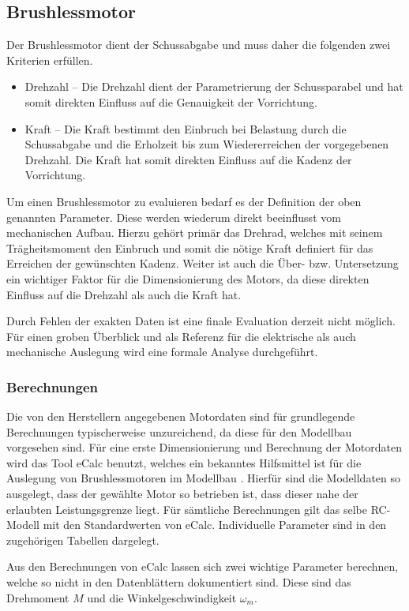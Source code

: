\subsection{Brushlessmotor}
Der Brushlessmotor dient der Schussabgabe und muss daher die folgenden
zwei Kriterien erfüllen.

\begin{itemize}
	\item Drehzahl -- Die Drehzahl dient der Parametrierung der
		Schussparabel und hat somit direkten Einfluss auf die
		Genauigkeit der Vorrichtung.
	\item Kraft -- Die Kraft bestimmt den Einbruch bei Belastung durch
		die Schussabgabe und die Erholzeit bis zum Wiedererreichen
		der vorgegebenen Drehzahl. Die Kraft hat somit direkten
		Einfluss auf die Kadenz der Vorrichtung.
\end{itemize}

Um einen Brushlessmotor zu evaluieren bedarf es der Definition der oben
genannten Parameter. Diese werden wiederum direkt beeinflusst vom 
mechanischen Aufbau. Hierzu gehört primär das Drehrad, welches mit seinem
Trägheitsmoment den Einbruch und somit die nötige Kraft definiert für das
Erreichen der gewünschten Kadenz. Weiter ist auch die Über- bzw.
Untersetzung ein wichtiger Faktor für die Dimensionierung des Motors, da
diese direkten Einfluss auf die Drehzahl als auch die Kraft hat.

Durch Fehlen der exakten Daten ist eine finale Evaluation derzeit nicht
möglich. Für einen groben Überblick und als Referenz für die elektrische
als auch mechanische Auslegung wird eine formale Analyse durchgeführt.

\subsubsection{Berechnungen}
Die von den Herstellern angegebenen Motordaten sind für grundlegende
Berechnungen typischerweise unzureichend, da diese für den Modellbau
vorgesehen sind. Für eine erste Dimensionierung und Berechnung der
Motordaten wird das Tool eCalc benutzt, welches ein bekanntes
Hilfsmittel ist für die Auslegung von Brushlessmotoren im Modellbau
\cite{ecalc}. Hierfür sind die Modelldaten so ausgelegt, dass der
gewählte Motor so betrieben ist, dass dieser nahe der erlaubten
Leistungsgrenze liegt. Für sämtliche Berechnungen gilt das selbe
RC-Modell mit den Standardwerten von eCalc. Individuelle Parameter
sind in den zugehörigen Tabellen dargelegt.

Aus den Berechnungen von eCalc lassen sich zwei wichtige Parameter
berechnen, welche so nicht in den Datenblättern dokumentiert sind.
Diese sind das Drehmoment $M$ und die Winkelgeschwindigkeit $\omega_m$.

